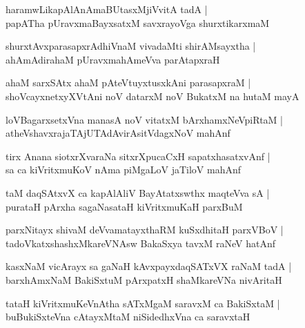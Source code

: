 \documentclass[twoside,12pt,openright]{book}
\newcounter{shloka}[chapter]
\begin{document}
\begin{shloka}%
haramwLikapAlAnAmaBUtasxMjiVvitA tadA |\\
papATha pUravxmaBayxsatxM savxrayoVga shurxtikarxmaM 
\end{shloka}

\begin{shloka}%
shurxtAvxparasapxrAdhiVnaM vivadaMti shirAMsayxtha |\\
ahAmAdirahaM pUravxmahAmeVva parAtapxraH 
\end{shloka}

\begin{shloka}%
ahaM sarxSAtx ahaM pAteVtuyxtusxkAni parasapxraM |\\
shoVcayxnetxyXVtAni noV datarxM noV BukatxM na hutaM mayA 
\end{shloka}

\begin{shloka}%
loVBagarxsetxVna manasA noV vitatxM bArxhamxNeVpiRtaM |\\
atheVshavxrajaTAjUTAdAvirAsitVdagxNoV mahAnf 
\end{shloka}

\begin{shloka}%
tirx Anana siotxrXvaraNa sitxrXpucaCxH sapatxhasatxvAnf |\\
sa ca kiVritxmuKoV nAma piMgaLoV jaTiloV mahAnf 
\end{shloka}

\begin{shloka}%
taM daqSAtxvX ca kapAlAliV BayAtatxswthx maqteVva sA |\\
purataH pArxha sagaNasataH kiVritxmuKaH parxBuM 
\end{shloka}

\begin{shloka}%
parxNitayx shivaM deVvamatayxthaRM kuSxdhitaH parxVBoV |\\
tadoVkatxshashxMkareVNAsw BakaSxya tavxM raNeV hatAnf 
\end{shloka}

\begin{shloka}%
kasxNaM vicArayx sa gaNaH kAvxpayxdaqSATxVX raNaM tadA |\\
barxhAmxNaM BakiSxtuM pArxpatxH shaMkareVNa nivAritaH 
\end{shloka}

\begin{shloka}%
tataH kiVritxmuKeVnAtha sATxMgaM saravxM ca BakiSxtaM |\\
buBukiSxteVna cAtayxMtaM niSidedhxVna ca saravxtaH 
\end{shloka}
\end{document}
